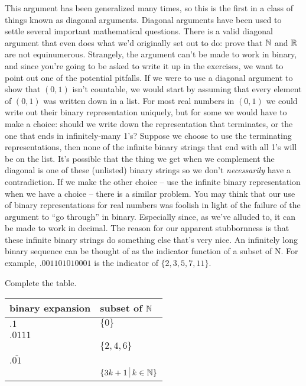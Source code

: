 This argument has been generalized many times, so this is the first in a
class of things known as diagonal arguments.  Diagonal arguments have been
used to settle several important mathematical questions.  There is a valid
diagonal argument that even does what we'd originally set out to do: prove
that ${\mathbb N}$  and ${\mathbb R}$ are not equinumerous.  Strangely, the 
argument can't be made to work in binary, and since you're going to be 
asked to write it up in the exercises, we want to point out one of the 
potential pitfalls.
If we were to use a diagonal argument to show that $(0, 1)$ isn't countable,
we would start by assuming that every element of $(0, 1)$ was written down in
a list. For most real numbers in $(0, 1)$ we could write out their 
binary representation uniquely, but for some we would have to make a 
choice: should we write down the representation that terminates, or 
the one that ends in infinitely-many 1's?  Suppose we choose to use 
the terminating representations, then none of the infinite binary 
strings that end with all 1's will be on the list. It's possible that 
the thing we get when we complement the diagonal
is one of these (unlisted) binary strings so we don't \emph{necessarily} 
have a contradiction.
If we make the other choice -- use the infinite binary representation
when we have a choice -- there is a similar problem.
You may think that our use of binary representations for real numbers
was foolish in light of the failure of the argument to ``go through'' 
in binary.
Especially since, as we've alluded to, it can be made to work in decimal.
The reason for our apparent stubbornness is that these infinite binary
strings do something else that's very nice.  An infinitely long binary sequence
can be thought of as the indicator function of a subset of N. For example,
$.001101010001$ is the indicator of $\{2, 3, 5, 7, 11\}$.

\begin{exer} 

Complete the table.
\medskip

\begin{center}
\begin{tabular}{l|l}
binary expansion & subset of ${\mathbb N}$ \\ \hline\hline
\rule[-4pt]{0pt}{20pt} $.1$ & $\{0\}$ \\\hline
\rule[-4pt]{0pt}{20pt}$.0111$ &   \\\hline
\rule[-4pt]{0pt}{20pt} & $\{2, 4, 6\}$ \\\hline
\rule[-4pt]{0pt}{20pt}$.\overline{01}$ & \\\hline
\rule[-4pt]{0pt}{20pt} & $\{3k + 1 \suchthat k \in \Naturals\}$ \\
\end{tabular}
\end{center}

\end{exer}


